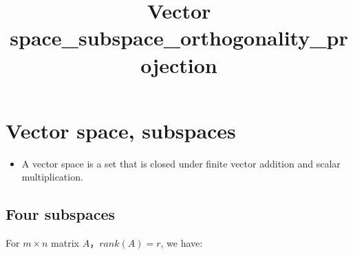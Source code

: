 \documentclass[11pt]{article}
\title{Vector space\_subspace\_orthogonality\_projection}
\providecommand{\tightlist}{%
      \setlength{\itemsep}{0pt}\setlength{\parskip}{0pt}}
\begin{document}
    
    
    \maketitle
    
    

    
    \section{Vector space, subspaces}\label{vector-space-subspaces}

\begin{itemize}
\tightlist
\item
  A vector space is a set that is closed under finite vector addition
  and scalar multiplication.
\end{itemize}

\subsection{Four subspaces}\label{four-subspaces}

For \(m \times n\) matrix \(A\)，\(rank(A)=r\), we have:
\end{document}
